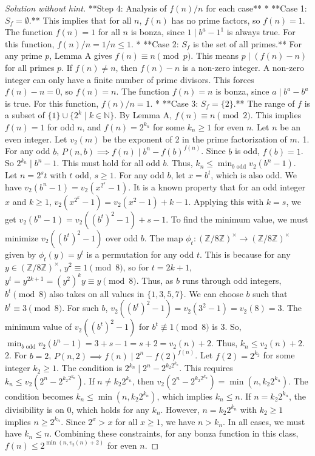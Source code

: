 \begin{proof} [Solution without hint]
**Step 4: Analysis of $f(n)/n$ for each case**
*   **Case 1: $S_f = \emptyset$.** This implies that for all $n$, $f(n)$ has no prime factors, so $f(n)=1$. The function $f(n)=1$ for all $n$ is bonza, since $1 \mid b^a - 1^{1}$ is always true. For this function, $f(n)/n = 1/n \le 1$.
*   **Case 2: $S_f$ is the set of all primes.** For any prime $p$, Lemma A gives $f(n) \equiv n \pmod p$. This means $p \mid (f(n)-n)$ for all primes $p$. If $f(n) \ne n$, then $f(n)-n$ is a non-zero integer. A non-zero integer can only have a finite number of prime divisors. This forces $f(n)-n=0$, so $f(n)=n$. The function $f(n)=n$ is bonza, since $a \mid b^a - b^a$ is true. For this function, $f(n)/n = 1$.
*   **Case 3: $S_f = \{2\}$.** The range of $f$ is a subset of $\{1\} \cup \{2^k \mid k \in \mathbb N\}$. By Lemma A, $f(n) \equiv n \pmod 2$. This implies $f(n)=1$ for odd $n$, and $f(n)=2^{k_n}$ for some $k_n \ge 1$ for even $n$.
    Let $n$ be an even integer. Let $v_2(m)$ be the exponent of 2 in the prime factorization of $m$.
    1.  For any odd $b$, $P(n,b) \implies f(n) \mid b^n-f(b)^{f(n)}$. Since $b$ is odd, $f(b)=1$. So $2^{k_n} \mid b^n-1$. This must hold for all odd $b$. Thus, $k_n \le \min_{b \text{ odd}} v_2(b^n-1)$.
        Let $n=2^s t$ with $t$ odd, $s \ge 1$. For any odd $b$, let $x=b^t$, which is also odd. We have $v_2(b^n-1) = v_2(x^{2^s}-1)$. It is a known property that for an odd integer $x$ and $k \ge 1$, $v_2(x^{2^k}-1) = v_2(x^2-1)+k-1$. Applying this with $k=s$, we get $v_2(b^n-1) = v_2((b^t)^2-1)+s-1$.
        To find the minimum value, we must minimize $v_2((b^t)^2-1)$ over odd $b$. The map $\phi_t: (\mathbb Z/8\mathbb Z)^\times \to (\mathbb Z/8\mathbb Z)^\times$ given by $\phi_t(y)=y^t$ is a permutation for any odd $t$. This is because for any $y \in (\mathbb Z/8\mathbb Z)^\times$, $y^2 \equiv 1 \pmod 8$, so for $t=2k+1$, $y^t = y^{2k+1} = (y^2)^k y \equiv y \pmod 8$. Thus, as $b$ runs through odd integers, $b^t \pmod 8$ also takes on all values in $\{1,3,5,7\}$. We can choose $b$ such that $b^t \equiv 3 \pmod 8$. For such $b$, $v_2((b^t)^2-1) = v_2(3^2-1)=v_2(8)=3$. The minimum value of $v_2((b^t)^2-1)$ for $b^t \not\equiv 1 \pmod 8$ is 3.
        So, $\min_{b \text{ odd}} v_2(b^n-1) = 3+s-1=s+2=v_2(n)+2$. Thus, $k_n \le v_2(n)+2$.
    2.  For $b=2$, $P(n,2) \implies f(n) \mid 2^n - f(2)^{f(n)}$. Let $f(2)=2^{k_2}$ for some integer $k_2 \ge 1$. The condition is $2^{k_n} \mid 2^n - 2^{k_2 2^{k_n}}$. This requires $k_n \le v_2(2^n - 2^{k_2 2^{k_n}})$.
        If $n \ne k_2 2^{k_n}$, then $v_2(2^n - 2^{k_2 2^{k_n}}) = \min(n, k_2 2^{k_n})$. The condition becomes $k_n \le \min(n, k_2 2^{k_n})$, which implies $k_n \le n$.
        If $n = k_2 2^{k_n}$, the divisibility is on $0$, which holds for any $k_n$. However, $n = k_2 2^{k_n}$ with $k_2 \ge 1$ implies $n \ge 2^{k_n}$. Since $2^x > x$ for all $x \ge 1$, we have $n > k_n$.
        In all cases, we must have $k_n \le n$.
    Combining these constraints, for any bonza function in this class, $f(n) \le 2^{\min(n, v_2(n)+2)}$ for even $n$.


\end{proof}

